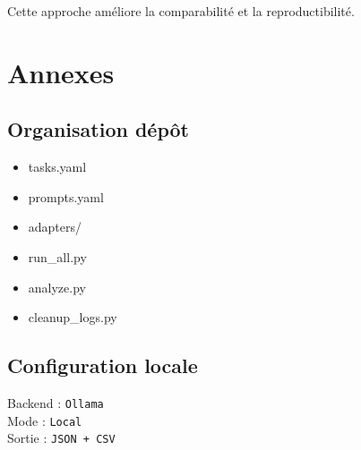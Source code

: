 \documentclass[12pt,a4paper]{article}
\begin{document}
Cette approche améliore
la comparabilité
et la reproductibilité.


\appendix

\section{Annexes}

\subsection{Organisation dépôt}

\begin{itemize}

\item tasks.yaml

\item prompts.yaml

\item adapters/

\item run\_all.py

\item analyze.py

\item cleanup\_logs.py

\end{itemize}

\subsection{Configuration locale}

Backend : \texttt{Ollama} \\
Mode : \texttt{Local} \\
Sortie : \texttt{JSON + CSV}
\end{document}
